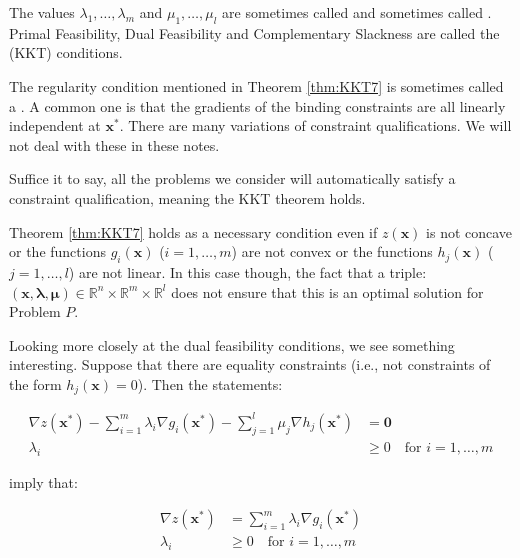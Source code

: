 The values $\lambda_1,\dots,\lambda_m$ and $\mu_1,\dots,\mu_l$ are sometimes called  and sometimes called . Primal Feasibility, Dual Feasibility and Complementary Slackness are called the  (KKT) conditions.

\begin{remark} The regularity condition mentioned in Theorem \ref{thm:KKT7} is sometimes called a . A common one is that the gradients of the binding constraints are all linearly independent at $\mathbf{x}^*$. There are many variations of constraint qualifications. We will not deal with these in these notes. 
    
    Suffice it to say, all the problems we consider will automatically satisfy a constraint qualification, meaning the KKT theorem holds.
\end{remark}

\begin{remark} Theorem \ref{thm:KKT7} holds as a necessary condition even if $z(\mathbf{x})$ is not concave or the functions $g_i(\mathbf{x})$ ($i=1,\dots,m$) are not convex or the functions $h_j(\mathbf{x})$ ($j=1,\dots,l$) are not linear. In this case though, the fact that a triple: $(\mathbf{x},\boldsymbol{\lambda}, \boldsymbol{\mu}) \in \mathbb{R}^{n} \times \mathbb{R}^m \times \mathbb{R}^l$ does not ensure that this is an optimal solution for Problem $P$.
\end{remark}

Looking more closely at the dual feasibility conditions, we see something interesting. Suppose that there are  equality constraints (i.e., not constraints of the form $h_j(\mathbf{x}) = 0$). Then the statements:

\begin{displaymath}
\begin{aligned}
\nabla z(\mathbf{x}^*) - \sum_{i = 1}^m\lambda_i \nabla g_i(\mathbf{x}^*) - \sum_{j = 1}^{l}\mu_j \nabla h_j(\mathbf{x}^*) & = \mathbf{0}\\
\lambda_i &\geq 0 \quad \text{for $i=1,\dots,m$}
\end{aligned}
\end{displaymath}

imply that:

\begin{displaymath}
\begin{aligned}
\nabla z(\mathbf{x}^*) &= \sum_{i = 1}^m\lambda_i \nabla g_i(\mathbf{x}^*)\\
\lambda_i &\geq 0 \quad \text{for $i=1,\dots,m$}
\end{aligned}
\end{displaymath}

